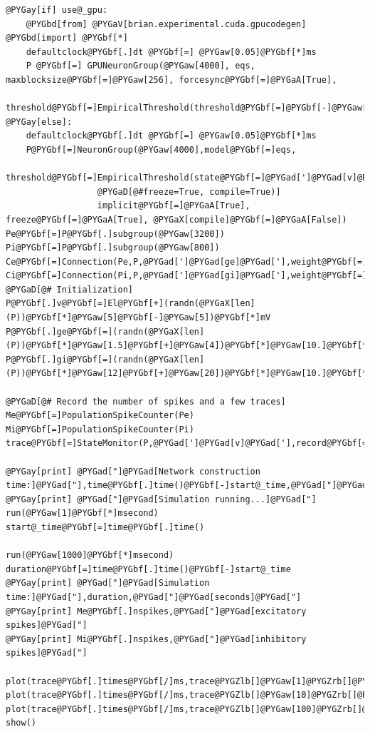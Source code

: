 \documentclass[letterpaper,10pt,english]{manual}
\begin{document}
\begin{Verbatim}[commandchars=@\[\]]
@PYGay[if] use@_gpu:
    @PYGbd[from] @PYGaV[brian.experimental.cuda.gpucodegen] @PYGbd[import] @PYGbf[*]
    defaultclock@PYGbf[.]dt @PYGbf[=] @PYGaw[0.05]@PYGbf[*]ms
    P @PYGbf[=] GPUNeuronGroup(@PYGaw[4000], eqs, maxblocksize@PYGbf[=]@PYGaw[256], forcesync@PYGbf[=]@PYGaA[True],
                     threshold@PYGbf[=]EmpiricalThreshold(threshold@PYGbf[=]@PYGbf[-]@PYGaw[20]@PYGbf[*]mV,refractory@PYGbf[=]@PYGaw[3]@PYGbf[*]ms))
@PYGay[else]:
    defaultclock@PYGbf[.]dt @PYGbf[=] @PYGaw[0.05]@PYGbf[*]ms
    P@PYGbf[=]NeuronGroup(@PYGaw[4000],model@PYGbf[=]eqs,
                  threshold@PYGbf[=]EmpiricalThreshold(state@PYGbf[=]@PYGad[']@PYGad[v]@PYGad['],threshold@PYGbf[=]@PYGbf[-]@PYGaw[20]@PYGbf[*]mV,refractory@PYGbf[=]@PYGaw[3]@PYGbf[*]ms),
                  @PYGaD[@#freeze=True, compile=True)]
                  implicit@PYGbf[=]@PYGaA[True], freeze@PYGbf[=]@PYGaA[True], @PYGaX[compile]@PYGbf[=]@PYGaA[False])
Pe@PYGbf[=]P@PYGbf[.]subgroup(@PYGaw[3200])
Pi@PYGbf[=]P@PYGbf[.]subgroup(@PYGaw[800])
Ce@PYGbf[=]Connection(Pe,P,@PYGad[']@PYGad[ge]@PYGad['],weight@PYGbf[=]we,sparseness@PYGbf[=]@PYGaw[0.02])
Ci@PYGbf[=]Connection(Pi,P,@PYGad[']@PYGad[gi]@PYGad['],weight@PYGbf[=]wi,sparseness@PYGbf[=]@PYGaw[0.02])
@PYGaD[@# Initialization]
P@PYGbf[.]v@PYGbf[=]El@PYGbf[+](randn(@PYGaX[len](P))@PYGbf[*]@PYGaw[5]@PYGbf[-]@PYGaw[5])@PYGbf[*]mV
P@PYGbf[.]ge@PYGbf[=](randn(@PYGaX[len](P))@PYGbf[*]@PYGaw[1.5]@PYGbf[+]@PYGaw[4])@PYGbf[*]@PYGaw[10.]@PYGbf[*]nS
P@PYGbf[.]gi@PYGbf[=](randn(@PYGaX[len](P))@PYGbf[*]@PYGaw[12]@PYGbf[+]@PYGaw[20])@PYGbf[*]@PYGaw[10.]@PYGbf[*]nS

@PYGaD[@# Record the number of spikes and a few traces]
Me@PYGbf[=]PopulationSpikeCounter(Pe)
Mi@PYGbf[=]PopulationSpikeCounter(Pi)
trace@PYGbf[=]StateMonitor(P,@PYGad[']@PYGad[v]@PYGad['],record@PYGbf[=]@PYGZlb[]@PYGaw[1],@PYGaw[10],@PYGaw[100]@PYGZrb[])

@PYGay[print] @PYGad["]@PYGad[Network construction time:]@PYGad["],time@PYGbf[.]time()@PYGbf[-]start@_time,@PYGad["]@PYGad[seconds]@PYGad["]
@PYGay[print] @PYGad["]@PYGad[Simulation running...]@PYGad["]
run(@PYGaw[1]@PYGbf[*]msecond)
start@_time@PYGbf[=]time@PYGbf[.]time()

run(@PYGaw[1000]@PYGbf[*]msecond)
duration@PYGbf[=]time@PYGbf[.]time()@PYGbf[-]start@_time
@PYGay[print] @PYGad["]@PYGad[Simulation time:]@PYGad["],duration,@PYGad["]@PYGad[seconds]@PYGad["]
@PYGay[print] Me@PYGbf[.]nspikes,@PYGad["]@PYGad[excitatory spikes]@PYGad["]
@PYGay[print] Mi@PYGbf[.]nspikes,@PYGad["]@PYGad[inhibitory spikes]@PYGad["]

plot(trace@PYGbf[.]times@PYGbf[/]ms,trace@PYGZlb[]@PYGaw[1]@PYGZrb[]@PYGbf[/]mV)
plot(trace@PYGbf[.]times@PYGbf[/]ms,trace@PYGZlb[]@PYGaw[10]@PYGZrb[]@PYGbf[/]mV)
plot(trace@PYGbf[.]times@PYGbf[/]ms,trace@PYGZlb[]@PYGaw[100]@PYGZrb[]@PYGbf[/]mV)
show()
\end{Verbatim}
\end{document}

